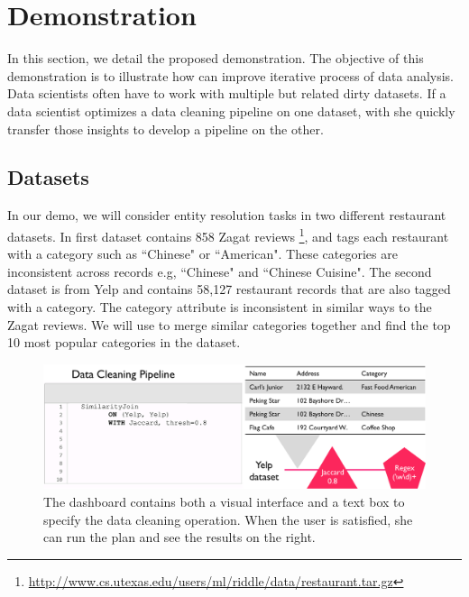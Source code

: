 \section{Demonstration}
In this section, we detail the proposed demonstration.
The objective of this demonstration is to illustrate 
how \sys can improve iterative process of data analysis.
Data scientists often have to work with multiple but related dirty datasets.
If a data scientist optimizes a data cleaning pipeline on one dataset, with \sys 
she quickly transfer those insights to develop a pipeline on the other.

\subsection{Datasets}
In our demo, we will consider entity resolution tasks in two different restaurant datasets.
In first dataset contains 858 Zagat reviews \footnote{\scriptsize{ \url{http://www.cs.utexas.edu/users/ml/riddle/data/restaurant.tar.gz}}},
and tags each restaurant with a category such as ``Chinese" or ``American".
These categories are inconsistent across records e.g, ``Chinese" and ``Chinese Cuisine".
The second dataset is from Yelp and contains 58,127 restaurant records that are also tagged with a category.
The category attribute is inconsistent in similar ways to the Zagat reviews.
We will use \sys to merge similar categories together and find the top 10 most popular categories in the dataset.

\begin{figure}[t]
\centering
 \includegraphics[width=\columnwidth]{figs/dashboard_screenshot.png}
 \caption{The dashboard contains both a visual interface and a text box to specify the data cleaning operation. When the user is satisfied, she can run the plan and see the results on the right. \label{screenshot}}
\end{figure}


